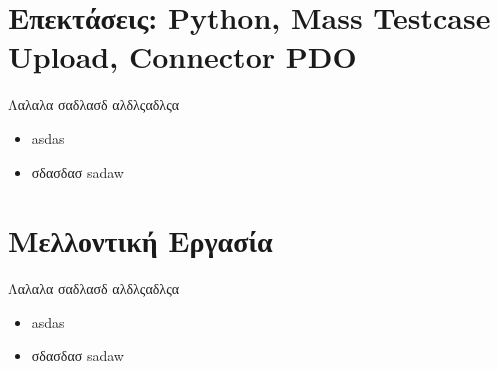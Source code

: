 \documentclass{beamer}
\begin{document}
\section{Επεκτάσεις: Python, Mass Testcase Upload, Connector PDO}
\begin{frame}
  Λαλαλα σαδλασδ αλδλςαδλςα
  \begin{itemize}
      \item asdas
      \item σδασδασ sadaw
  \end{itemize}
\end{frame}


\section{Μελλοντική Εργασία}
\begin{frame}
  Λαλαλα σαδλασδ αλδλςαδλςα
  \begin{itemize}
      \item asdas
      \item σδασδασ sadaw
  \end{itemize}
\end{frame}
\end{document}
